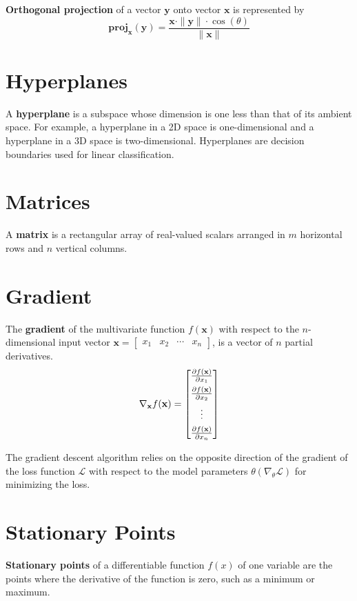 \documentclass{article}
\begin{document}
\textbf{Orthogonal projection} of a vector $\mathbf{y}$ onto vector $\mathbf{x}$ is represented by
\[\mathbf{proj}_\mathbf{x}(\mathbf{y})=\frac{\mathbf{x}\cdot\|\mathbf{y}\|\cdot\cos (\theta)}{\|\mathbf{x}\|}\]

\section*{Hyperplanes}
A \textbf{hyperplane} is a subspace whose dimension is one less than that of its ambient space. For example, a hyperplane in a 2D space is one-dimensional and a hyperplane in a 3D space is two-dimensional. Hyperplanes are decision boundaries used for linear classification.

\section*{Matrices}
A \textbf{matrix} is a rectangular array of real-valued scalars arranged in $m$ horizontal rows and $n$ vertical columns.

\section*{Gradient}
The \textbf{gradient} of the multivariate function $f(\mathbf{x})$ with respect to the $n$-dimensional input vector $\mathbf{x}=\begin{bmatrix}
    x_1 & x_2 & \cdots & x_n
\end{bmatrix}$, is a vector of $n$ partial derivatives.
\[\nabla_\mathbf{x} f(\mathbf{x})={\begin{bmatrix}
    \frac{\partial f(\mathbf{x})}{\partial x_1} \vspace{4pt}\\
    \frac{\partial f(\mathbf{x})}{\partial x_2} \vspace{4pt}\\
    \vdots \vspace{4pt}\\
    \frac{\partial f(\mathbf{x})}{\partial x_n}
\end{bmatrix}}\]

The gradient descent algorithm relies on the opposite direction of the gradient of the loss function $\mathcal{L}$ with respect to the model parameters $\theta (\nabla_\theta \mathcal{L})$ for minimizing the loss.

\section*{Stationary Points}
\textbf{Stationary points} of a differentiable function $f(x)$ of one variable are the points where the derivative of the function is zero, such as a minimum or maximum.
\end{document}
